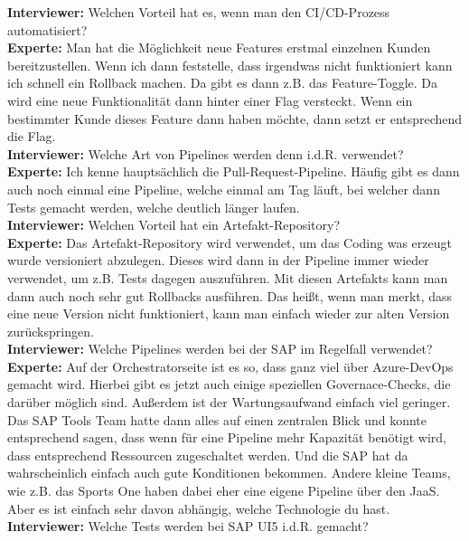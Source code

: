 \begin{linenumbers}
    \textbf{Interviewer:} Welchen Vorteil hat es, wenn man den CI/CD-Prozess automatisiert?\\
    \textbf{Experte:} Man hat die Möglichkeit neue Features erstmal einzelnen Kunden bereitzustellen. Wenn ich dann feststelle, dass irgendwas nicht funktioniert kann ich schnell ein Rollback machen. Da gibt es dann z.B. das Feature-Toggle. Da wird eine neue Funktionalität dann hinter einer Flag versteckt. Wenn ein bestimmter Kunde dieses Feature dann haben möchte, dann setzt er entsprechend die Flag.\\
    \textbf{Interviewer:} Welche Art von Pipelines werden denn i.d.R. verwendet?\\
    \textbf{Experte:} Ich kenne hauptsächlich die Pull-Request-Pipeline. Häufig gibt es dann auch noch einmal eine Pipeline, welche einmal am Tag läuft, bei welcher dann Tests gemacht werden, welche deutlich länger laufen.\\
    \textbf{Interviewer:} Welchen Vorteil hat ein Artefakt-Repository?\\
    \textbf{Experte:} Das Artefakt-Repository wird verwendet, um das Coding was erzeugt wurde versioniert abzulegen. Dieses wird dann in der Pipeline immer wieder verwendet, um z.B. Tests dagegen auszuführen. Mit diesen Artefakts kann man dann auch noch sehr gut Rollbacks ausführen. Das heißt, wenn man merkt, dass eine neue Version nicht funktioniert, kann man einfach wieder zur alten Version zurückspringen.\\
    \textbf{Interviewer:} Welche Pipelines werden bei der SAP im Regelfall verwendet?\\
    \textbf{Experte:} Auf der Orchestratorseite ist es so, dass ganz viel über Azure-DevOps gemacht wird. Hierbei gibt es jetzt auch einige speziellen Governace-Checks, die darüber möglich sind. Außerdem ist der Wartungsaufwand einfach viel geringer. Das SAP Tools Team hatte dann alles auf einen zentralen Blick und konnte entsprechend sagen, dass wenn für eine Pipeline mehr Kapazität benötigt wird, dass entsprechend Ressourcen zugeschaltet werden. Und die SAP hat da wahrscheinlich einfach auch gute Konditionen bekommen. Andere kleine Teams, wie z.B. das Sports One haben dabei eher eine eigene Pipeline über den JaaS. Aber es ist einfach sehr davon abhängig, welche Technologie du hast.\\
    \textbf{Interviewer:} Welche Tests werden bei SAP UI5 i.d.R. gemacht?\\

\end{linenumbers}
